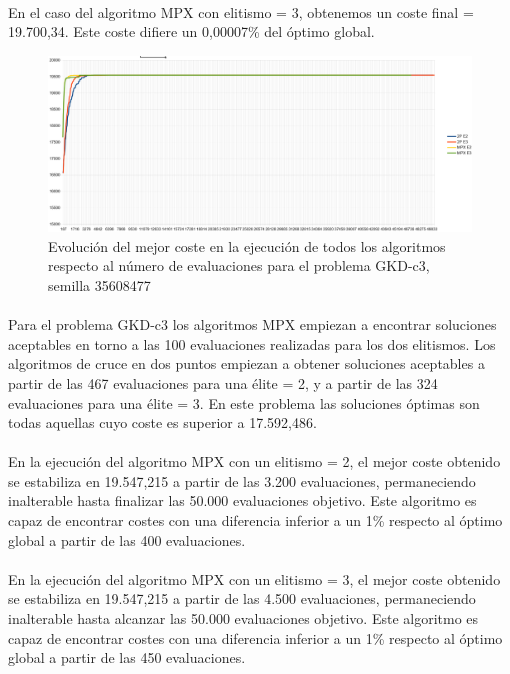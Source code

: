 	\paragraph{}En el caso del algoritmo MPX con elitismo = 3, obtenemos un coste final = 19.700,34. Este coste difiere un 0,00007\% del óptimo global.

	\begin{figure}[H]
		\centering
		\includegraphics[scale=0.3]{img/35608477_GKD-c_3_n500_m50.png}
		\caption{Evolución del mejor coste en la ejecución de todos los algoritmos respecto al número de evaluaciones para el problema GKD-c3, semilla 35608477}
		\label{gkd-c3_historico}
	\end{figure}

	\paragraph{}Para el problema GKD-c3 los algoritmos MPX empiezan a encontrar soluciones aceptables en torno a las 100 evaluaciones realizadas para los dos elitismos. Los algoritmos de cruce en dos puntos empiezan a obtener soluciones aceptables a partir de las 467 evaluaciones para una élite = 2, y a partir de las 324 evaluaciones para una élite = 3. En este problema las soluciones óptimas son todas aquellas cuyo coste es superior a 17.592,486.
	
	\paragraph{}En la ejecución del algoritmo MPX con un elitismo = 2, el mejor coste obtenido se estabiliza en 19.547,215 a partir de las 3.200 evaluaciones, permaneciendo inalterable hasta finalizar las 50.000 evaluaciones objetivo. Este algoritmo es capaz de encontrar costes con una diferencia inferior a un 1\% respecto al óptimo global a partir de las 400 evaluaciones.
	
	\paragraph{}En la ejecución del algoritmo MPX con un elitismo = 3, el mejor coste obtenido se estabiliza en 19.547,215 a partir de las 4.500 evaluaciones, permaneciendo inalterable hasta alcanzar las 50.000 evaluaciones objetivo. Este algoritmo es capaz de encontrar costes con una diferencia inferior a un 1\% respecto al óptimo global a partir de las 450 evaluaciones.
	
